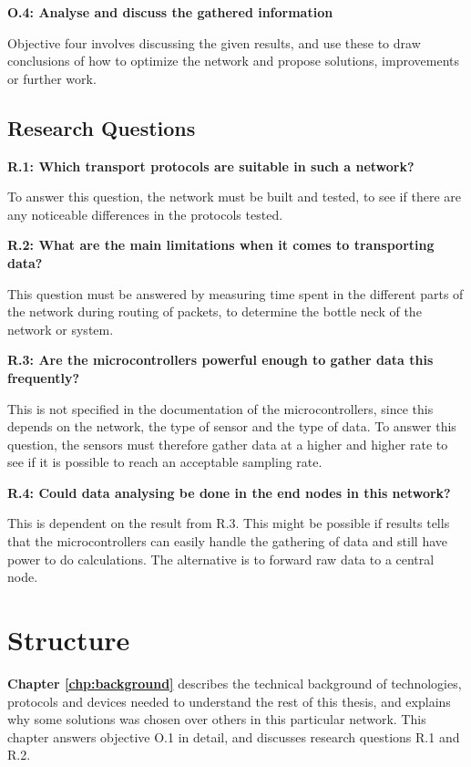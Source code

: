 \noindent\textbf{O.4: Analyse and discuss the gathered information}

Objective four involves discussing the given results, and use these to draw conclusions of how to optimize the network and propose solutions, improvements or further work. 

\subsection{Research Questions}

\noindent \textbf{R.1: Which transport protocols are suitable in such a network?}

To answer this question, the network must be built and tested, to see if there are any noticeable differences in the protocols tested.

\noindent\textbf{R.2: What are the main limitations when it comes to transporting data?}

This question must be answered by measuring time spent in the different parts of the network during routing of packets, to determine the bottle neck of the network or system. 

\noindent\textbf{R.3: Are the microcontrollers powerful enough to gather data this frequently?}

This is not specified in the documentation of the microcontrollers, since this depends on the network, the type of sensor and the type of data. To answer this question, the sensors must therefore gather data at a higher and higher rate to see if it is possible to reach an acceptable sampling rate. 

\noindent\textbf{R.4: Could data analysing be done in the end nodes in this network?}

This is dependent on the result from R.3. This might be possible if results tells that the microcontrollers can easily handle the gathering of data and still have power to do calculations. The alternative is to forward raw data to a central node. 

\section{Structure}


\noindent \textbf{Chapter \ref{chp:background}} describes the technical background of technologies, protocols and devices needed to understand the rest of this thesis, and explains why some solutions was chosen over others in this particular network. This chapter answers objective O.1 in detail, and discusses research questions R.1 and R.2. 


